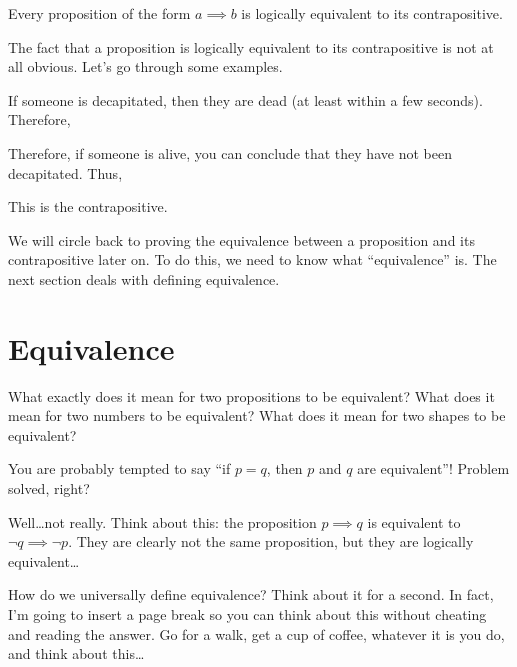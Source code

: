 \begin{theorem}
  \label{reductio-ad-absurdum}
  Every proposition of the form $a \implies b$ is logically equivalent
  to its contrapositive.
\end{theorem}

The fact that a proposition is logically equivalent to its
contrapositive is not at all obvious. Let's go through some examples.

\begin{example}
  If someone is decapitated, then they are dead (at least within a few
  seconds). Therefore,

  \begin{zz}
     \implies {}
  \end{zz}


  Therefore, if someone is alive, you can conclude that they have not
  been decapitated. Thus,

  \begin{zz}
     \implies {}
  \end{zz}

  This is the contrapositive.
\end{example}

We will circle back to proving the equivalence between a proposition
and its contrapositive later on. To do this, we need to know what
``equivalence'' is. The next section deals with defining equivalence.

\section{Equivalence}

What exactly does it mean for two propositions to be equivalent? What
does it mean for two numbers to be equivalent? What does it mean for
two shapes to be equivalent?

You are probably tempted to say ``if $p = q$, then $p$ and $q$ are
equivalent''! Problem solved, right?

Well\dots not really. Think about this: the proposition $p \implies q$
is equivalent to $\lnot q \implies \lnot p$. They are clearly not the
same proposition, but they are logically equivalent\dots

How do we universally define equivalence? Think about it for a
second. In fact, I'm going to insert a page break so you can think
about this without cheating and reading the answer. Go for a walk, get
a cup of coffee, whatever it is you do, and think about this\dots


